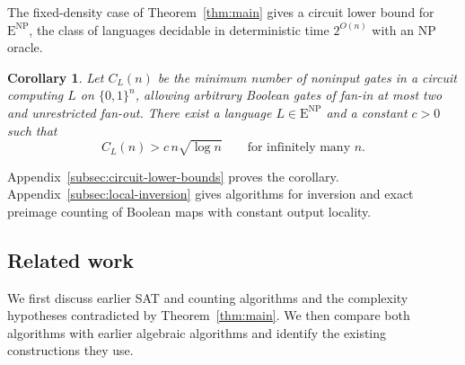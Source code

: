 \documentclass[11pt,reqno]{amsart}
\numberwithin{equation}{section}
\newtheorem{corollary}[theorem]{Corollary}
\theoremstyle{definition}\newtheorem{definition}[theorem]{Definition}
\theoremstyle{remark}\newtheorem{remark}[theorem]{Remark}
\begin{document}
The fixed-density case of Theorem~\ref{thm:main} gives a circuit lower
bound for $\mathrm E^{\mathrm{NP}}$, the class of languages decidable
in deterministic time $2^{O(n)}$ with an NP oracle.

\begin{corollary}\label{cor:quantitative-circuits}
Let $C_L(n)$ be the minimum number of noninput gates in a circuit
computing $L$ on $\{0,1\}^n$, allowing arbitrary Boolean gates of
fan-in at most two and unrestricted fan-out. There exist a language
$L\in\mathrm E^{\mathrm{NP}}$ and a constant $c>0$ such that
\begin{equation}\label{eq:quantitative-circuit-lower-bound}
 C_L(n)>c\,n\sqrt{\log n}\qquad\text{for infinitely many }n.
\end{equation}
\end{corollary}

Appendix~\ref{subsec:circuit-lower-bounds} proves the corollary.
Appendix~\ref{subsec:local-inversion} gives algorithms for inversion
and exact preimage counting of Boolean maps with constant output locality.

\subsection{Related work}\label{sec:related}
We first discuss earlier SAT and counting algorithms and the
complexity hypotheses contradicted by Theorem~\ref{thm:main}.
We then compare both algorithms with earlier algebraic algorithms and
identify the existing constructions they use.
\end{document}
